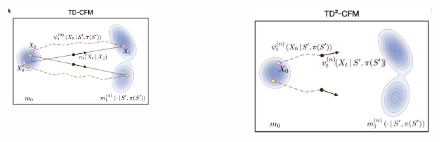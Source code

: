 \documentclass{beamer}
\begin{document}
\begin{frame}
    \begin{columns}
        \begin{column}{0.49\linewidth}
        \begin{figure}
            \includegraphics[width=\linewidth]{figures/td-cfm.png}
        \end{figure}
        \end{column}
        \begin{column}{0.49\linewidth}
        \begin{figure}
            \includegraphics[width=\linewidth]{figures/td2-cfm.png}
        \end{figure}
        \end{column}
    \end{columns}
\end{frame}
\end{document}

